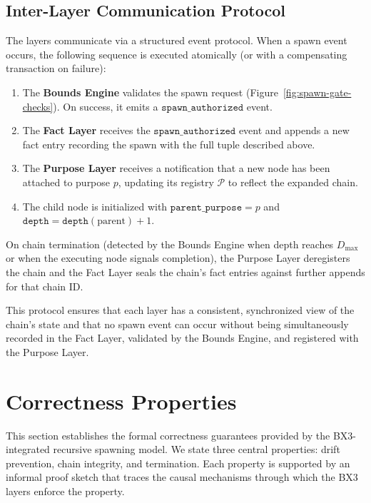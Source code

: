 \subsection{Inter-Layer Communication Protocol}
\label{sec:inter-layer-communication}

The layers communicate via a structured event protocol. When a spawn event occurs, the following sequence is executed atomically (or with a compensating transaction on failure):

\begin{enumerate}
    \item The \textbf{Bounds Engine} validates the spawn request (Figure~\ref{fig:spawn-gate-checks}). On success, it emits a $\texttt{spawn\_authorized}$ event.
    \item The \textbf{Fact Layer} receives the $\texttt{spawn\_authorized}$ event and appends a new fact entry recording the spawn with the full tuple described above.
    \item The \textbf{Purpose Layer} receives a notification that a new node has been attached to purpose $p$, updating its registry $\mathcal{P}$ to reflect the expanded chain.
    \item The child node is initialized with $\texttt{parent\_purpose} = p$ and $\texttt{depth} = \texttt{depth}(\text{parent}) + 1$.
\end{enumerate}

On chain termination (detected by the Bounds Engine when depth reaches $D_{\max}$ or when the executing node signals completion), the Purpose Layer deregisters the chain and the Fact Layer seals the chain's fact entries against further appends for that chain ID.

This protocol ensures that each layer has a consistent, synchronized view of the chain's state and that no spawn event can occur without being simultaneously recorded in the Fact Layer, validated by the Bounds Engine, and registered with the Purpose Layer.

\vfill\null\pagebreak

\section{Correctness Properties}
\label{sec:correctness}

This section establishes the formal correctness guarantees provided by the BX3-integrated recursive spawning model. We state three central properties: drift prevention, chain integrity, and termination. Each property is supported by an informal proof sketch that traces the causal mechanisms through which the BX3 layers enforce the property.

